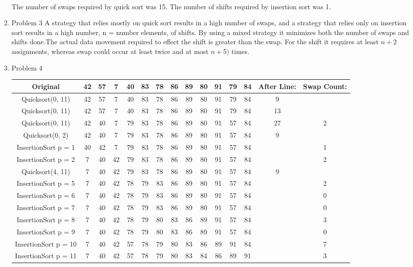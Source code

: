 \documentclass[11pt]{article}
\begin{document}
\begin{enumerate}
\begin{center}
\begin{tabular}{c|cccccccccccc|cc}
\end{tabular}
\end{center}

\\The number of swaps required by quick sort was 15. The number of shifts required by insertion sort was 1.


\item Problem 3
A strategy that relies mostly on quick sort results in a high number of swaps, and a strategy that relies only on insertion sort results in a high number, n = number elements,  of shifts. By using a mixed strategy it minimizes both the number of swaps and shifts done.The actual data movement required to effect the shift is greater than the swap. For the shift it requires at least $n+2$ assignments, whereas swap could occur at least twice and at most $n + 5)$ times.


\item Problem 4
\begin{center}
\begin{tabular}{c|cccccccccccc|cc}
Original & 42& 57& 7& 40& 83& 78& 86& 89& 80& 91& 79& 84 & After Line:& Swap Count:\\\hline
Quicksort(0, 11)&42& 57& 7& 40& 83& 78& 86& 89& 80& 91& 79& 84&9\\
Quicksort(0, 11)&42& 57& 7& 40& 83& 78& 86& 89& 80& 91& 79& 84&13\\
Quicksort(0, 11)&42& 40& 7& 79& 83& 78& 86& 89& 80& 91& 57& 84&27&2\\
Quicksort(0, 2)&42& 40& 7& 79& 83& 78& 86& 89& 80& 91& 57& 84&9\\
InsertionSort p = 1 &40& 42& 7& 79& 83& 78& 86& 89& 80& 91& 57& 84&&1\\
InsertionSort p = 2 &7& 40& 42& 79& 83& 78& 86& 89& 80& 91& 57& 84&&2\\
Quicksort(4, 11)&7& 40& 42& 79& 83& 78& 86& 89& 80& 91& 57& 84&9\\
InsertionSort p = 5 &7& 40& 42& 78& 79& 83& 86& 89& 80& 91& 57& 84&&2\\
InsertionSort p = 6 &7& 40& 42& 78& 79& 83& 86& 89& 80& 91& 57& 84&&0\\
InsertionSort p = 7 &7& 40& 42& 78& 79& 83& 86& 89& 80& 91& 57& 84&&0\\
InsertionSort p = 8 &7& 40& 42& 78& 79& 80& 83& 86& 89& 91& 57& 84&&3\\
InsertionSort p = 9 &7& 40& 42& 78& 79& 80& 83& 86& 89& 91& 57& 84&&0\\
InsertionSort p = 10 &7& 40& 42& 57& 78& 79& 80& 83& 86& 89& 91& 84&&7\\
InsertionSort p = 11 &7& 40& 42& 57& 78& 79& 80& 83& 84& 86& 89& 91&&3
\end{tabular}
\end{center}


\end{enumerate}
\end{document}
